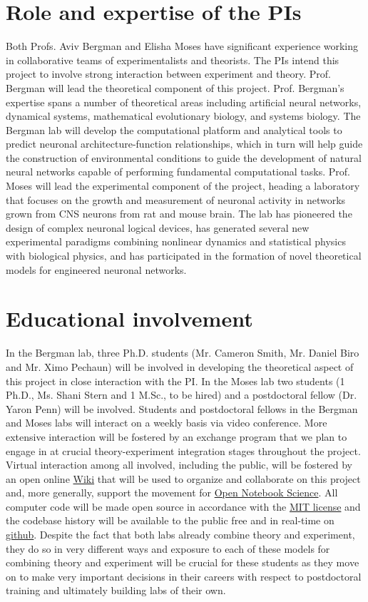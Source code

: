 \section{Role and expertise of the PIs}
Both Profs. Aviv Bergman and Elisha Moses have significant experience working in collaborative teams of experimentalists and theorists. The PIs intend this project to involve strong interaction between experiment and theory. Prof. Bergman will lead the theoretical component of this project. Prof. Bergman's expertise spans a number of theoretical areas including artificial neural networks, dynamical systems, mathematical evolutionary biology, and systems biology. The Bergman lab will develop the computational platform and analytical tools to predict neuronal architecture-function relationships, which in turn will help guide the construction of environmental conditions to guide the development of natural neural networks capable of performing fundamental computational tasks. Prof. Moses will lead the experimental component of the project, heading a laboratory that focuses on the growth and measurement of neuronal activity in networks grown from CNS neurons from rat and mouse brain. The lab has pioneered the design of complex neuronal logical devices, has generated several new experimental paradigms combining nonlinear dynamics and statistical physics with biological physics, and has participated in the formation of novel theoretical models for engineered neuronal networks.

\section{Educational involvement}
In the Bergman lab, three Ph.D. students (Mr. Cameron Smith, Mr. Daniel Biro and Mr. Ximo Pechaun) will be involved in developing the theoretical aspect of this project in close interaction with the PI. In the Moses lab two students (1 Ph.D., Ms. Shani Stern and 1 M.Sc., to be hired) and a postdoctoral fellow (Dr. Yaron Penn) will be involved. Students and postdoctoral fellows in the Bergman and Moses labs will interact on a weekly basis via video conference. More extensive interaction will be fostered by an exchange program that we plan to engage in at crucial theory-experiment integration stages throughout the project. Virtual interaction among all involved, including the public, will be fostered by an open online \href{http://en.wikipedia.org/wiki/Wiki}{Wiki} that will be used to organize and collaborate on this project and, more generally, support the movement for \href{http://en.wikipedia.org/wiki/Open\_notebook\_science}{Open Notebook Science}. All computer code will be made open source in accordance with the \href{http://opensource.org/licenses/MIT}{MIT license} and the codebase history will be available to the public free and in real-time on \href{http://www.github.com}{github}. Despite the fact that both labs already combine theory and experiment, they do so in very different ways and exposure to each of these models for combining theory and experiment will be crucial for these students as they move on to make very important decisions in their careers with respect to postdoctoral training and ultimately building labs of their own.